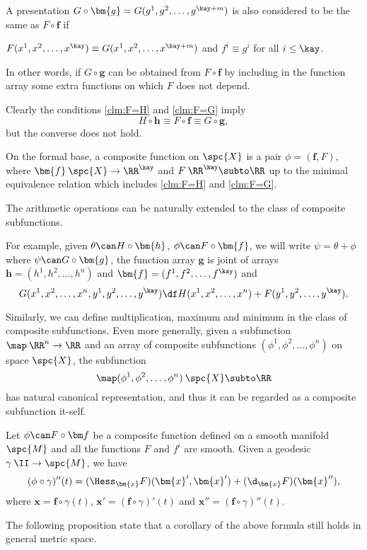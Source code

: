 A presentation $G\circ \bm{g}=G(g^1,g^2,\dots,g^{\kay+m})$
is also considered to be the same as $F\circ\bm{f}$
if 
\begin{clm}{}\label{clm:F=G}
$F(x^1,x^2,\dots,x^\kay)
\equiv
G(x^1,x^2,\dots,x^{\kay+m})$
and
$f^i\equiv g^i$
for all $i\le \kay$.
\end{clm}
\noi In other words, if $G\circ \bm{g}$ can be obtained from $F\circ\bm{f}$ by including in the function array some extra functions on which $F$ does not depend.

Clearly the conditions \ref{clm:F=H} and \ref{clm:F=G} imply 
\[H\circ\bm{h}
\equiv 
F\circ\bm{f}\equiv G\circ \bm{g},\]
but the converse does not hold.

On the formal base, 
a composite function on $\spc{X}$
is a pair $\phi=(\bm{f}, F)$, where $\bm{f}\:\spc{X}\to\RR^\kay$ and $F\:\RR^\kay\subto\RR$ up to the minimal equivalence relation which includes \ref{clm:F=H} and \ref{clm:F=G}.

The arithmetic operations can be naturally extended to the class of composite subfunctions.

For example, given $\theta\can H\circ\bm{h}$, $\phi\can F\circ\bm{f}$, we will write $\psi=\theta+\phi$ where $\psi\can G\circ\bm{g}$,
the function array
$\bm{g}$ is joint of arrays $\bm{h}=(h^1,h^2,\dots,h^n)$ and $\bm{f}=(f^1,f^2,\dots,f^\kay)$ and 
\[
G(x^1,x^2,\dots,x^n,y^1,y^2,\dots,y^\kay)
\df
H(x^1,x^2,\dots,x^n)
+
F(y^1,y^2,\dots,y^\kay).\]

Similarly, we can define multiplication,  maximum and minimum in the class of composite subfunctions.
Even more generally, 
given a subfunction $\map\:\RR^n\to\RR$ 
and an array of composite subfunctions $(\phi^1,\phi^2,\dots,\phi^n)$ on space $\spc{X}$,
the subfunction 
\[
\map(\phi^1,\phi^2,\dots,\phi^n)\:\spc{X}\subto\RR
\]
has natural canonical representation, 
and thus it can be regarded as a composite subfunction it-self.

Let $\phi\can F\circ\bm f$ be a composite function defined on a smooth manifold $\spc{M}$
and all the functions $F$ and $f^i$ are smooth.
Given a geodesic $\gamma\:\II\to\spc{M}$, we have
\[
(\phi\circ\gamma)''(t)
=
(\Hess_{\bm{x}} F)(\bm{x}',\bm{x}')
+
(\d_{\bm{x}}F)(\bm{x}''),
\]
where $\bm{x}=\bm{f}\circ\gamma(t)$,
$\bm{x}'=(\bm{f}\circ\gamma)'(t)$
and 
$\bm{x}''=(\bm{f}\circ\gamma)''(t)$.

The following proposition state that a corollary of the above formula still holds in general metric space. 

